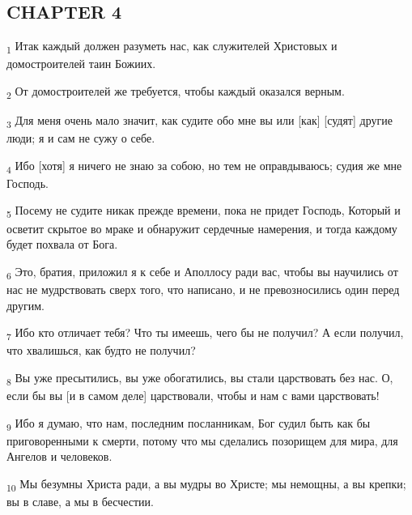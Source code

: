 \subsection{CHAPTER 4}
\begin{tcolorbox}
\textsubscript{1} Итак каждый должен разуметь нас, как служителей Христовых и домостроителей таин Божиих.
\end{tcolorbox}
\begin{tcolorbox}
\textsubscript{2} От домостроителей же требуется, чтобы каждый оказался верным.
\end{tcolorbox}
\begin{tcolorbox}
\textsubscript{3} Для меня очень мало значит, как судите обо мне вы или [как] [судят] другие люди; я и сам не сужу о себе.
\end{tcolorbox}
\begin{tcolorbox}
\textsubscript{4} Ибо [хотя] я ничего не знаю за собою, но тем не оправдываюсь; судия же мне Господь.
\end{tcolorbox}
\begin{tcolorbox}
\textsubscript{5} Посему не судите никак прежде времени, пока не придет Господь, Который и осветит скрытое во мраке и обнаружит сердечные намерения, и тогда каждому будет похвала от Бога.
\end{tcolorbox}
\begin{tcolorbox}
\textsubscript{6} Это, братия, приложил я к себе и Аполлосу ради вас, чтобы вы научились от нас не мудрствовать сверх того, что написано, и не превозносились один перед другим.
\end{tcolorbox}
\begin{tcolorbox}
\textsubscript{7} Ибо кто отличает тебя? Что ты имеешь, чего бы не получил? А если получил, что хвалишься, как будто не получил?
\end{tcolorbox}
\begin{tcolorbox}
\textsubscript{8} Вы уже пресытились, вы уже обогатились, вы стали царствовать без нас. О, если бы вы [и в самом деле] царствовали, чтобы и нам с вами царствовать!
\end{tcolorbox}
\begin{tcolorbox}
\textsubscript{9} Ибо я думаю, что нам, последним посланникам, Бог судил быть как бы приговоренными к смерти, потому что мы сделались позорищем для мира, для Ангелов и человеков.
\end{tcolorbox}
\begin{tcolorbox}
\textsubscript{10} Мы безумны Христа ради, а вы мудры во Христе; мы немощны, а вы крепки; вы в славе, а мы в бесчестии.
\end{tcolorbox}

